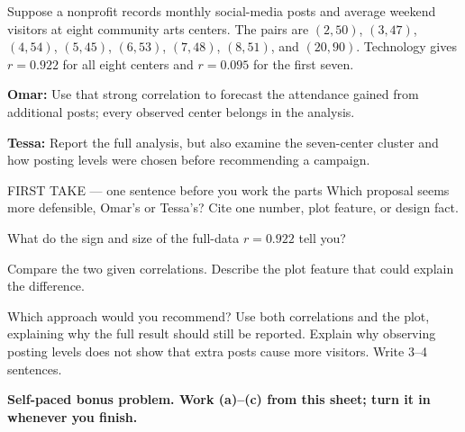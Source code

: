 \documentclass[14pt]{extarticle}
\begin{document}
\pagestyle{empty}


\noindent\begin{minipage}[t]{0.57\linewidth}
\vspace{0pt}
Suppose a nonprofit records monthly social-media posts and average weekend visitors at eight community arts centers. The pairs are $(2,50)$, $(3,47)$, $(4,54)$, $(5,45)$, $(6,53)$, $(7,48)$, $(8,51)$, and $(20,90)$. Technology gives $r=0.922$ for all eight centers and $r=0.095$ for the first seven.\par\smallskip \textbf{Omar:} Use that strong correlation to forecast the attendance gained from additional posts; every observed center belongs in the analysis.\par \textbf{Tessa:} Report the full analysis, but also examine the seven-center cluster and how posting levels were chosen before recommending a campaign.\par
\end{minipage}\hfill
\begin{minipage}[t]{0.40\linewidth}
\vspace{0pt}
\begin{center}
\end{center}
\end{minipage}

\begin{firsttakebox}{FIRST TAKE --- one sentence before you work the parts}
Which proposal seems more defensible, Omar's or Tessa's? Cite one number, plot feature, or design fact.
\end{firsttakebox}

\begin{description}[leftmargin=1.15in, labelwidth=1in, itemsep=2pt, topsep=2pt]
  \item[\dokbadge{1}~(a)] What do the sign and size of the full-data $r=0.922$ tell you?
  \item[\dokbadge{2}~(b)] Compare the two given correlations. Describe the plot feature that could explain the difference.
  \item[\dokbadge{3}~(c)] Which approach would you recommend? Use both correlations and the plot, explaining why the full result should still be reported. Explain why observing posting levels does not show that extra posts cause more visitors. Write 3--4 sentences.
\end{description}

\vfill
\textbf{Self-paced bonus problem. Work (a)--(c) from this sheet; turn it in whenever you finish.}
\end{document}
